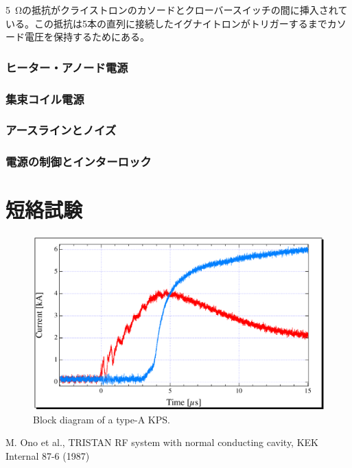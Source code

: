 \documentclass[book,openany]{jlreq}
\theoremstyle{definition}
\begin{document}
\SI{5}{\ohm}の抵抗がクライストロンのカソードとクローバースイッチの間に挿入されている。この抵抗は5本の直列に接続したイグナイトロンがトリガーするまでカソード電圧を保持するためにある。

\subsection{ヒーター・アノード電源}

\subsection{集束コイル電源}

\subsection{アースラインとノイズ}
\subsection{電源の制御とインターロック}

\chapter{短絡試験}

\begin{figure}[!htt]
    \begin{center}
        \includegraphics[width=12cm,clip]{figs/sc_test.pdf}
        \caption{Block diagram of a type-A KPS.}
        \label{sctest}
    \end{center}
\end{figure}


\begin{thebibliography}{9}
    M. Ono et al., TRISTAN RF system with normal conducting cavity, KEK Internal 87-6 (1987)
\end{thebibliography}
%
\end{document}
